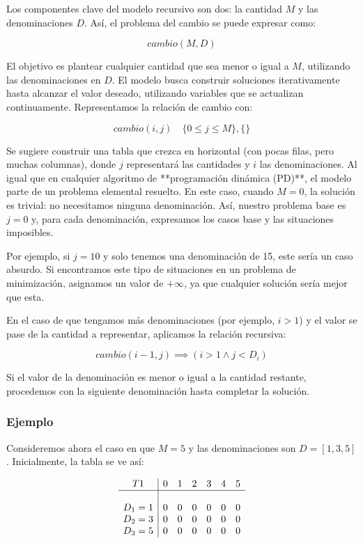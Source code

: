 Los componentes clave del modelo recursivo son dos: la cantidad $M$ y las denominaciones $D$. Así, el problema del cambio se puede expresar como:

$$
	cambio(M, D)
$$

El objetivo es plantear cualquier cantidad que sea menor o igual a $M$, utilizando las denominaciones en $D$. El modelo busca construir soluciones iterativamente hasta alcanzar el valor deseado, utilizando variables que se actualizan continuamente. Representamos la relación de cambio con:

$$
	cambio(i, j) \quad \{0 \leq j \leq M\}, \{\}
$$

Se sugiere construir una tabla que crezca en horizontal (con pocas filas, pero muchas columnas), donde $j$ representará las cantidades y $i$ las denominaciones. Al igual que en cualquier algoritmo de **programación dinámica (PD)**, el modelo parte de un problema elemental resuelto. En este caso, cuando $M=0$, la solución es trivial: no necesitamos ninguna denominación. Así, nuestro problema base es $j = 0$ y, para cada denominación, expresamos los casos base y las situaciones imposibles.

Por ejemplo, si $j=10$ y solo tenemos una denominación de 15, este sería un caso absurdo. Si encontramos este tipo de situaciones en un problema de minimización, asignamos un valor de $+\infty$, ya que cualquier solución sería mejor que esta.

En el caso de que tengamos más denominaciones (por ejemplo, $i > 1$) y el valor se pase de la cantidad a representar, aplicamos la relación recursiva:

$$
	cambio(i-1, j) \implies (i > 1 \land j < D_i)
$$

Si el valor de la denominación es menor o igual a la cantidad restante, procedemos con la siguiente denominación hasta completar la solución.

\subsubsection{Ejemplo}

Consideremos ahora el caso en que $M=5$ y las denominaciones son $D=[1, 3, 5]$. Inicialmente, la tabla se ve así:

\[
	\begin{array}{c|cccccc}
		T1    & 0 & 1 & 2 & 3 & 4 & 5 \\
		\hline                        \\
		D_1=1 & 0 & 0 & 0 & 0 & 0 & 0 \\
		D_2=3 & 0 & 0 & 0 & 0 & 0 & 0 \\
		D_3=5 & 0 & 0 & 0 & 0 & 0 & 0 \\
	\end{array}
\]

